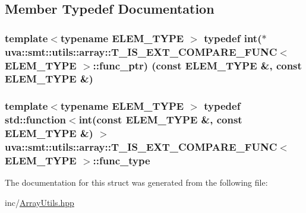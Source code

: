 \subsection{Member Typedef Documentation}
\hypertarget{structuva_1_1smt_1_1utils_1_1array_1_1_t___i_s___e_x_t___c_o_m_p_a_r_e___f_u_n_c_aa0d104e289af2a3bf008c5051821212e}{}
\subsubsection[{func\+\_\+ptr}]{\setlength{\rightskip}{0pt plus 5cm}template$<$typename E\+L\+E\+M\+\_\+\+T\+Y\+P\+E $>$ typedef int($\ast$  {\bf uva\+::smt\+::utils\+::array\+::\+T\+\_\+\+I\+S\+\_\+\+E\+X\+T\+\_\+\+C\+O\+M\+P\+A\+R\+E\+\_\+\+F\+U\+N\+C}$<$ E\+L\+E\+M\+\_\+\+T\+Y\+P\+E $>$\+::func\+\_\+ptr) (const E\+L\+E\+M\+\_\+\+T\+Y\+P\+E \&, const E\+L\+E\+M\+\_\+\+T\+Y\+P\+E \&)}\label{structuva_1_1smt_1_1utils_1_1array_1_1_t___i_s___e_x_t___c_o_m_p_a_r_e___f_u_n_c_aa0d104e289af2a3bf008c5051821212e}
\hypertarget{structuva_1_1smt_1_1utils_1_1array_1_1_t___i_s___e_x_t___c_o_m_p_a_r_e___f_u_n_c_ae36341efb501d528ceaaf0978b41cae3}{}
\subsubsection[{func\+\_\+type}]{\setlength{\rightskip}{0pt plus 5cm}template$<$typename E\+L\+E\+M\+\_\+\+T\+Y\+P\+E $>$ typedef std\+::function$<$int(const E\+L\+E\+M\+\_\+\+T\+Y\+P\+E \&, const E\+L\+E\+M\+\_\+\+T\+Y\+P\+E \&) $>$ {\bf uva\+::smt\+::utils\+::array\+::\+T\+\_\+\+I\+S\+\_\+\+E\+X\+T\+\_\+\+C\+O\+M\+P\+A\+R\+E\+\_\+\+F\+U\+N\+C}$<$ E\+L\+E\+M\+\_\+\+T\+Y\+P\+E $>$\+::{\bf func\+\_\+type}}\label{structuva_1_1smt_1_1utils_1_1array_1_1_t___i_s___e_x_t___c_o_m_p_a_r_e___f_u_n_c_ae36341efb501d528ceaaf0978b41cae3}


The documentation for this struct was generated from the following file\+:\begin{DoxyCompactItemize}
\item 
inc/\hyperlink{_array_utils_8hpp}{Array\+Utils.\+hpp}\end{DoxyCompactItemize}
